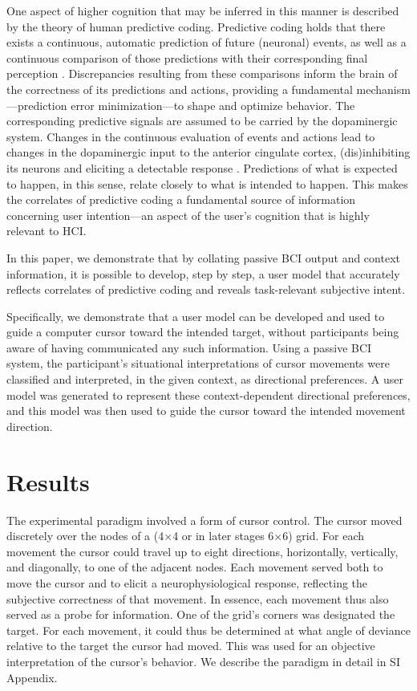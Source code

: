 One aspect of higher cognition that may be inferred in this manner is described by the theory of human predictive coding. Predictive coding holds that there exists a continuous, automatic prediction of future (neuronal) events, as well as a continuous comparison of those predictions with their corresponding final perception \cite{clark2013predictive,friston2010free,brown2011inference}. Discrepancies resulting from these comparisons inform the brain of the correctness of its predictions and actions, providing a fundamental mechanism---prediction error minimization---to shape and optimize behavior. The corresponding predictive signals are assumed to be carried by the dopaminergic system. Changes in the continuous evaluation of events and actions lead to changes in the dopaminergic input to the anterior cingulate cortex, (dis)inhibiting its neurons and eliciting a detectable response \cite{holroyd2002}. Predictions of what is expected to happen, in this sense, relate closely to what is intended to happen. This makes the correlates of predictive coding a fundamental source of information concerning user intention---an aspect of the user's cognition that is highly relevant to HCI.

In this paper, we demonstrate that by collating passive BCI output and context information, it is possible to develop, step by step, a user model that accurately reflects correlates of predictive coding and reveals task-relevant subjective intent.

Specifically, we demonstrate that a user model can be developed and used to guide a computer cursor toward the intended target, without participants being aware of having communicated any such information. Using a passive BCI system, the participant's situational interpretations of cursor movements were classified and interpreted, in the given context, as directional preferences. A user model was generated to represent these context-dependent directional preferences, and this model was then used to guide the cursor toward the intended movement direction.


\section{Results}

The experimental paradigm involved a form of cursor control. The cursor moved discretely over the nodes of a (4$\times$4 or in later stages 6$\times$6) grid. For each movement the cursor could travel up to eight directions, horizontally, vertically, and diagonally, to one of the adjacent nodes. Each movement served both to move the cursor and to elicit a neurophysiological response, reflecting the subjective correctness of that movement. In essence, each movement thus also served as a probe for information. One of the grid's corners was designated the target. For each movement, it could thus be determined at what angle of deviance relative to the target the cursor had moved. This was used for an objective interpretation of the cursor's behavior. We describe the paradigm in detail in SI Appendix.

